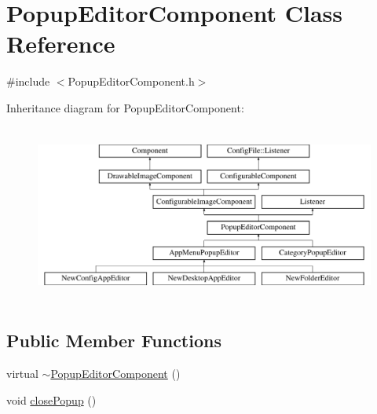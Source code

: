 \hypertarget{classPopupEditorComponent}{}\section{Popup\+Editor\+Component Class Reference}
\label{classPopupEditorComponent}


{\ttfamily \#include $<$Popup\+Editor\+Component.\+h$>$}

Inheritance diagram for Popup\+Editor\+Component\+:\begin{figure}[H]
\begin{center}
\leavevmode
\includegraphics[height=5.925926cm]{classPopupEditorComponent}
\end{center}
\end{figure}
\subsection*{Public Member Functions}
\begin{DoxyCompactItemize}
\item 
virtual \mbox{\hyperlink{classPopupEditorComponent_aeb019a4035a60ff85d624a77643cf877}{$\sim$\+Popup\+Editor\+Component}} ()
\item 
void \mbox{\hyperlink{classPopupEditorComponent_ac7d85aa58f5e84956e9b2efc5c9a9795}{close\+Popup}} ()
\end{DoxyCompactItemize}
